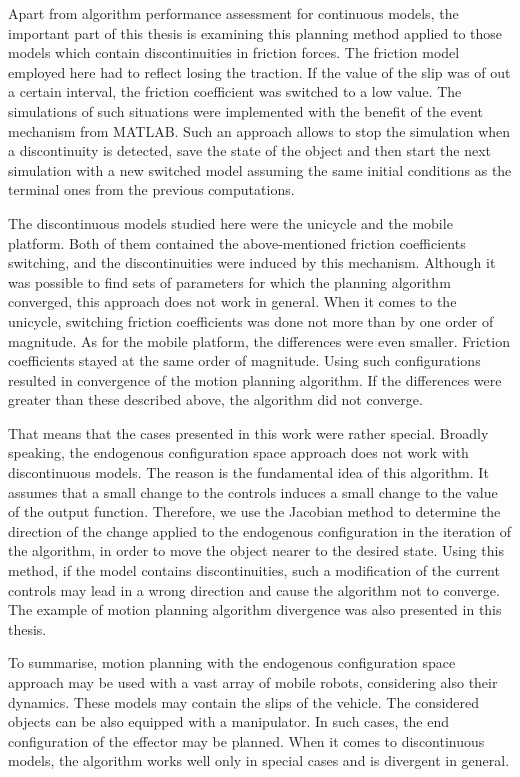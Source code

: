 Apart from algorithm performance assessment for continuous models, the important part of this thesis is examining this planning method applied to those models which contain discontinuities in friction forces. The friction model employed here had to reflect losing the traction. If the value of the slip was of out a certain interval, the friction coefficient was switched to a low value. The simulations of such situations were implemented with the benefit of the event mechanism from MATLAB. Such an approach allows to stop the simulation when a discontinuity is detected, save the state of the object and then start the next simulation with a new switched model assuming the same initial conditions as the terminal ones from the previous computations.

The discontinuous models studied here were the unicycle and the mobile platform. Both of them contained the above-mentioned friction coefficients switching, and the discontinuities were induced by this mechanism. Although it was possible to find sets of parameters for which the planning algorithm converged, this approach does not work in general. When it comes to the unicycle, switching friction coefficients was done not more than by one order of magnitude. As for the mobile platform, the differences were even smaller. Friction coefficients stayed at the same order of magnitude. Using such configurations resulted in convergence of the motion planning algorithm. If the differences were greater than these described above, the algorithm did not converge.

That means that the cases presented in this work were rather special. Broadly speaking, the endogenous configuration space approach does not work with discontinuous models. The reason is the fundamental idea of this algorithm. It assumes that a small change to the controls induces a small change to the value of the output function. Therefore, we use the Jacobian method to determine the direction of the change applied to the endogenous configuration in the iteration of the algorithm, in order to move the object nearer to the desired state. Using this method, if the model contains discontinuities, such a modification of the current controls may lead in a wrong direction and cause the algorithm not to converge. The example of motion planning algorithm divergence was also presented in this thesis.

To summarise, motion planning with the endogenous configuration space approach may be used with a vast array of mobile robots, considering also their dynamics. These models may contain the slips of the vehicle. The considered objects can be also equipped with a manipulator. In such cases, the end configuration of the effector may be planned. When it comes to discontinuous models, the algorithm works well only in special cases and is divergent in general.